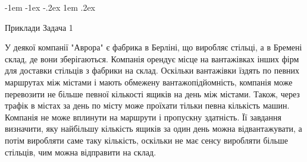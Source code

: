 \documentclass[a4paper,14pt,russian,ukrainian,oneside,final]{extreport}
\makeatletter
\newlength{\fivecharsapprox}
\newlength{\fivecharsapproxs}
\renewcommand\section{%
  \clearpage\@startsection {section}{0}%
    {\fivecharsapproxs}%
    {-1em \@plus -1ex \@minus -.2ex}%
    {1em \@plus .2ex}%
    {\raggedright\hyphenpenalty=10000\normalfont\large\bfseries\MakeUppercase {}}
}
\makeatother
\begin{document}
\section{Приклади}
Задача 1

\indent У деякої компанії "Аврора" є фабрика в Берліні, що виробляє стільці, а в Бремені склад, де вони зберігаються. Компанія орендує місце на вантажівках інших фірм для доставки стільців з фабрики на склад. Оскільки вантажівки їздять по певних маршрутах між містами і мають обмежену вантажопідйомність, компанія може перевозити не більше певної кількості ящиків на день між містами. Також, через трафік в містах за день по місту може проїхати тільки певна кількість машин. Компанія не може вплинути на маршрути і пропускну здатність. Її завдання визначити, яку найбільшу кількість ящиків за один день можна відвантажувати, а потім виробляти саме таку кількість, оскільки не має сенсу виробляти більше стільців, чим можна відправити на склад.
\end{document}
